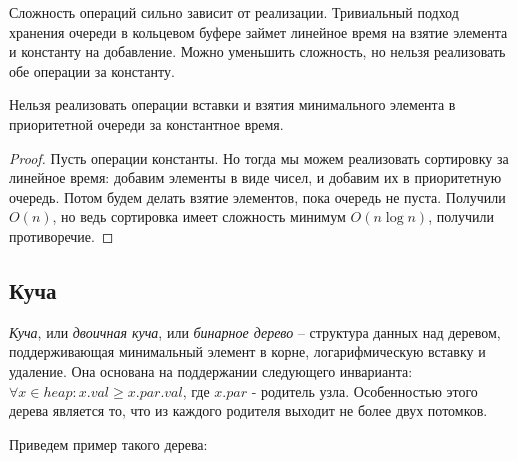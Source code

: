 \documentclass[../main.tex]{subfiles}
\begin{document}
	Сложность операций сильно зависит от реализации. Тривиальный подход хранения очереди в кольцевом буфере займет линейное время на взятие элемента и константу на добавление. Можно уменьшить сложность, но нельзя реализовать обе операции за константу.
	
	\begin{theorem}
		Нельзя реализовать операции вставки и взятия минимального элемента в приоритетной очереди за константное время.
	\end{theorem}
	\begin{proof}
		Пусть операции константы. Но тогда мы можем реализовать сортировку за линейное время: добавим элементы в виде чисел, и добавим их в приоритетную очередь. Потом будем делать взятие элементов, пока очередь не пуста. Получили $O(n)$, но ведь сортировка имеет сложность минимум $O(n \log n)$, получили противоречие.
	\end{proof}
	
	\subsection{Куча}
	
	\textit{Куча}, или \textit{двоичная куча}, или \textit{бинарное дерево} -- структура данных над деревом, поддерживающая минимальный элемент в корне, логарифмическую вставку и удаление. Она основана на поддержании следующего инварианта: $\forall x \in heap: x.val \geqslant x.par.val$, где $x.par$ - родитель узла. Особенностью этого дерева является то, что из каждого родителя выходит не более двух потомков.
	
	Приведем пример такого дерева:
	
\end{document}
